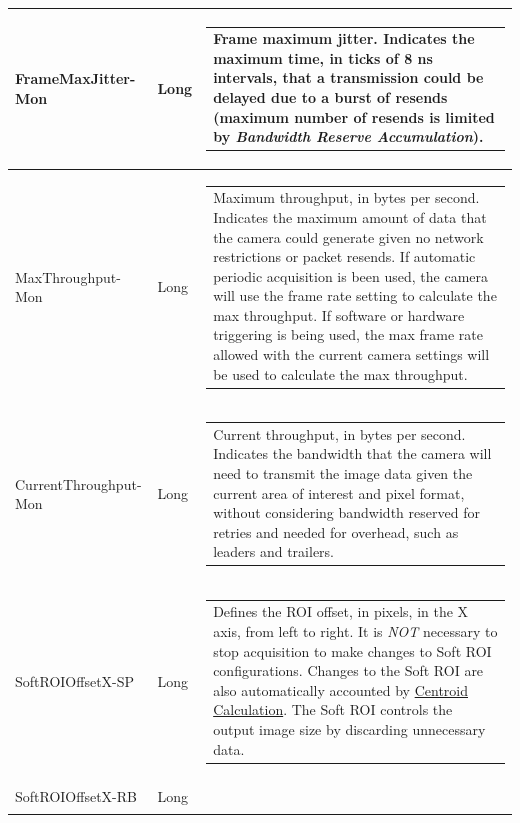 \documentclass[openany]{article}
\begin{document}
\begin{longtable}{| m{3.0cm} m{4.5cm}  m{7.0cm} |}
        FrameMaxJitter-Mon & Long & \begin{tabular}{@{}m{6cm}@{}}
                Frame maximum jitter. Indicates the maximum time, in ticks of 8 ns intervals, that a transmission could be delayed due to a burst of resends (maximum number of resends is limited by \emph{Bandwidth Reserve Accumulation}).
            \end{tabular} \hypertarget{pv:max-throughput}{}\\ \hline
        MaxThroughput-Mon & Long & \begin{tabular}{@{}m{6cm}@{}}
                Maximum throughput, in bytes per second. Indicates the maximum amount of data that the camera could generate given no network restrictions or packet resends. If automatic periodic acquisition is been used, the camera will use the frame rate setting to calculate the max throughput. If software or hardware triggering is being used, the max frame rate allowed with the current camera settings will be used to calculate the max throughput.
            \end{tabular} \hypertarget{pv:current-throughput}{}\\ \hline
        CurrentThroughput-Mon & Long & \begin{tabular}{@{}m{6cm}@{}}
                Current throughput, in bytes per second. Indicates the bandwidth that the camera will need to transmit the image data given the current area of interest and pixel format, without considering bandwidth reserved for retries and needed for overhead, such as leaders and trailers.
            \end{tabular} \hypertarget{pv:soft-roi-off-x}{}\\ \hline
        SoftROIOffsetX-SP & Long & \begin{tabular}{@{}m{6cm}@{}}
                Defines the ROI offset, in pixels, in the X axis, from left to right.
                It is \emph{NOT} necessary to stop acquisition to make changes to Soft ROI 
                configurations. Changes to the Soft ROI are also automatically accounted by
                \hyperref[sec:centroid-calc]{Centroid Calculation}.
                The Soft ROI controls the output image size by discarding unnecessary data.
            \end{tabular} \\ \hline
        SoftROIOffsetX-RB & Long & \begin{tabular}{@{}m{6cm}@{}}

\end{tabular}
\end{longtable}
\end{document}
